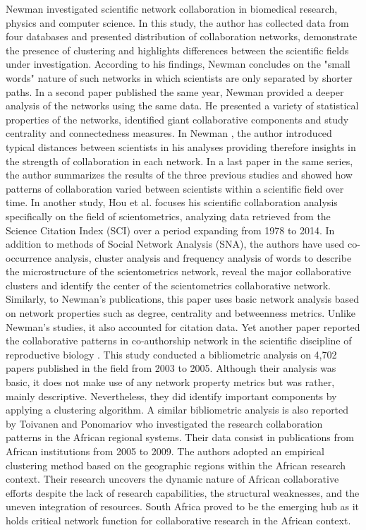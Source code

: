 Newman \cite{newman_structure_2001} investigated scientific network collaboration in biomedical research, physics and computer science. In this study, the author has collected data from four databases and presented distribution of collaboration networks, demonstrate the presence of clustering and highlights differences between the scientific fields under investigation. According to his findings, Newman \cite{newman_structure_2001} concludes on the "small words" nature of such networks in which scientists are only separated by shorter paths. In a second paper published the same year, Newman \cite{newman_scientific_2001} provided a deeper analysis of the networks using the same data. He presented a variety of statistical properties of the networks, identified giant collaborative components and study centrality and connectedness measures. In Newman \cite{newman_scientific_2001-1}, the author introduced typical distances between scientists in his analyses providing therefore insights in the strength of collaboration in each network. In a last paper in the same series, the author summarizes the results of the three previous studies and showed how patterns of collaboration varied between scientists within a scientific field over time. In another study, Hou et al. \cite{hou_structure_2008} focuses his scientific collaboration analysis specifically on the field of scientometrics, analyzing data retrieved from the Science Citation Index (SCI) over a period expanding from 1978 to 2014. In addition to methods of Social Network Analysis (SNA), the authors have used co-occurrence analysis, cluster analysis and frequency analysis of words to describe the microstructure of the scientometrics network, reveal the major collaborative clusters and identify the center of the scientometrics collaborative network. Similarly, to Newman’s publications, this paper uses basic network analysis based on network properties such as degree, centrality and betweenness metrics. Unlike Newman’s studies, it also accounted for citation data. Yet another paper reported the collaborative patterns in co-authorship network in the scientific discipline of reproductive biology \cite{gonzalez-alcaide_coauthorship_2008}. This study conducted a bibliometric analysis on 4,702 papers published in the field from 2003 to 2005. Although their analysis was basic, it does not make use of any network property metrics but was rather, mainly descriptive. Nevertheless, they did identify important components by applying a clustering algorithm. A similar bibliometric analysis is also reported by Toivanen and Ponomariov \cite{toivanen_african_2011} who investigated the research collaboration patterns in the African regional systems. Their data consist in publications from African institutions from 2005 to 2009. The authors adopted an empirical clustering method based on the geographic regions within the African research context. Their research uncovers the dynamic nature of African collaborative efforts despite the lack of research capabilities, the structural weaknesses, and the uneven integration of resources. South Africa proved to be the emerging hub as it holds critical network function for collaborative research in the African context.\\
